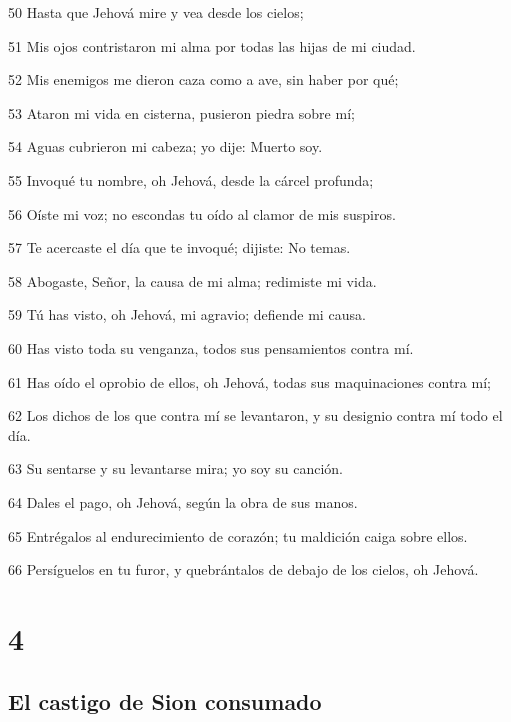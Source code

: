 \par 50 Hasta que Jehová mire y vea desde los cielos;
\par 51 Mis ojos contristaron mi alma por todas las hijas de mi ciudad.
\par 52 Mis enemigos me dieron caza como a ave, sin haber por qué;
\par 53 Ataron mi vida en cisterna, pusieron piedra sobre mí;
\par 54 Aguas cubrieron mi cabeza; yo dije: Muerto soy.
\par 55 Invoqué tu nombre, oh Jehová, desde la cárcel profunda;
\par 56 Oíste mi voz; no escondas tu oído al clamor de mis suspiros.
\par 57 Te acercaste el día que te invoqué; dijiste: No temas.
\par 58 Abogaste, Señor, la causa de mi alma; redimiste mi vida.
\par 59 Tú has visto, oh Jehová, mi agravio; defiende mi causa.
\par 60 Has visto toda su venganza, todos sus pensamientos contra mí.
\par 61 Has oído el oprobio de ellos, oh Jehová, todas sus maquinaciones contra mí;
\par 62 Los dichos de los que contra mí se levantaron, y su designio contra mí todo el día.
\par 63 Su sentarse y su levantarse mira; yo soy su canción.
\par 64 Dales el pago, oh Jehová, según la obra de sus manos.
\par 65 Entrégalos al endurecimiento de corazón; tu maldición caiga sobre ellos.
\par 66 Persíguelos en tu furor, y quebrántalos de debajo de los cielos, oh Jehová. 

\chapter{4}

\section*{El castigo de Sion consumado}

